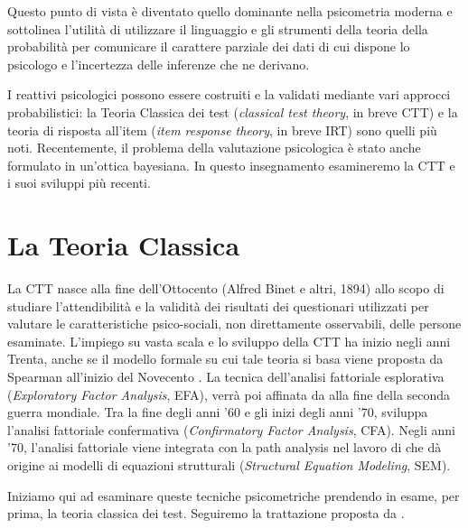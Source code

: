 \documentclass[
  11pt,
]{krantz}
\theoremstyle{definition}
\theoremstyle{definition}
\theoremstyle{definition}
\theoremstyle{definition}
\theoremstyle{remark}
\begin{document}
Questo punto di vista è diventato quello dominante nella psicometria moderna e sottolinea l'utilità di utilizzare il linguaggio e gli strumenti della teoria della probabilità per comunicare il carattere parziale dei dati di cui dispone lo psicologo e l'incertezza delle inferenze che ne derivano.

I reattivi psicologici possono essere costruiti e la validati mediante vari approcci probabilistici: la Teoria Classica dei test (\emph{classical test theory}, in breve CTT) e la teoria di risposta all'item (\emph{item response theory}, in breve IRT) sono quelli più noti. Recentemente, il problema della valutazione psicologica è stato anche formulato in un'ottica bayesiana. In questo insegnamento esamineremo la CTT e i suoi sviluppi più recenti.

\hypertarget{la-teoria-classica}{%
\section{La Teoria Classica}\label{la-teoria-classica}}

La CTT nasce alla fine dell'Ottocento (Alfred Binet e altri, 1894) allo scopo di studiare l'attendibilità e la validità dei risultati dei questionari utilizzati per valutare le caratteristiche psico-sociali, non direttamente osservabili, delle persone esaminate. L'impiego su vasta scala e lo sviluppo della CTT ha inizio negli anni Trenta, anche se il modello formale su cui tale teoria si basa viene proposta da Spearman all'inizio del Novecento \citep{ch1904general}. La tecnica dell'analisi fattoriale esplorativa (\emph{Exploratory Factor Analysis}, EFA), verrà poi affinata da \citet{thurstone1947multiple} alla fine della seconda guerra mondiale. Tra la fine degli anni '60 e gli inizi degli anni '70, \citet{joreskog1969general} sviluppa l'analisi fattoriale confermativa (\emph{Confirmatory Factor Analysis}, CFA). Negli anni '70, l'analisi fattoriale viene integrata con la path analysis nel lavoro di \citet{joreskog1978structural} che dà origine ai modelli di equazioni strutturali (\emph{Structural Equation Modeling}, SEM).

Iniziamo qui ad esaminare queste tecniche psicometriche prendendo in esame, per prima, la teoria classica dei test. Seguiremo la trattazione proposta da \citet{lord1968statistical}.
\end{document}
